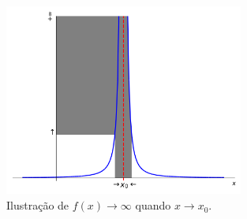 \begin{figure}[H]
  \centering
  \includegraphics[width=0.7\textwidth]{./cap_lim/dados/fig_liminf/fig_liminf}
  \caption{Ilustração de $f(x)\to\infty$ quando $x\to x_0$.}
  \label{fig:liminf}
\end{figure}



